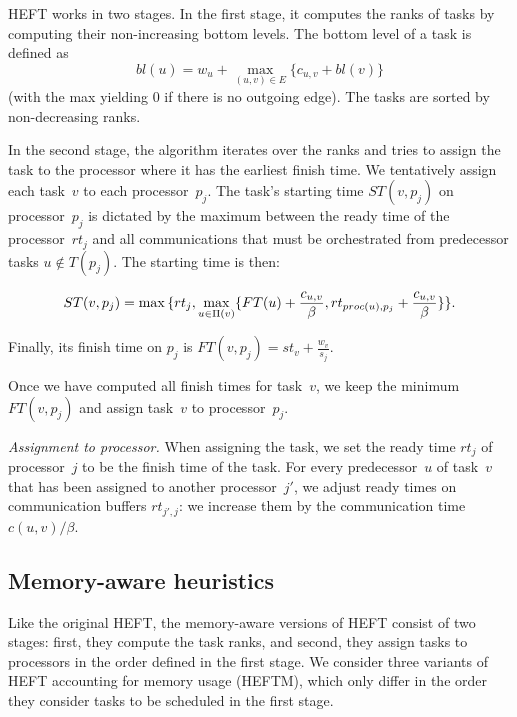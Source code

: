\documentclass[conference]{IEEEtran}
\begin{document}
HEFT works in two stages.
In the first stage, it computes the ranks of tasks by computing their non-increasing bottom levels.
The bottom level of a task is defined as
\[
bl(u) = w_u + \max_{(u,v)\in E} \{c_{u,v} + bl(v)\}
\]
(with the max yielding $0$ if there is no outgoing edge).
The tasks are sorted by non-decreasing ranks.

In the second stage, the algorithm iterates over the ranks and tries to assign the task to the processor where it
has the earliest finish time.
We tentatively assign each task~$v$ to each processor~$p_j$.
The task's starting time $ST(v,p_j)$ on processor~$p_j$ is dictated by the maximum between the ready time of the processor~$rt_j$
and all communications that
must be orchestrated from predecessor tasks $u\notin T(p_j)$.
The starting time is then:

{\footnotesize{   \[ST(v, p_j) = \max{ \Large\{rt_j, \max_{ u \in \Pi(v)}\{ FT(u)+ \frac{c_{u,v}}{\beta} , 
rt_{proc(u), p_j} + \frac{c_{u,v}}{\beta}  \} \Large\} } . \]}}

Finally, its finish time on $p_j$ is
$FT(v,p_j) = st_v + \frac{w_v}{s_j}$.

Once we have computed all finish times for task~$v$,
we keep the minimum $FT(v,p_j)$ and assign task~$v$
to processor~$p_j$.

\textit{Assignment to processor. }
When assigning the task, we set the ready time $rt_j$ of  processor~$j$ to be the finish time of the task.
For every predecessor~$u$ of task~$v$ that has been assigned to another processor~$j'$, we adjust ready times on
communication buffers $rt_{j', j}$: %
we increase them by the
communication time $c( u,v) / \beta$.


\subsection{Memory-aware heuristics}
\label{sec.heftm}
%
Like the original HEFT, the memory-aware versions of HEFT consist of two stages:
first, they compute the task ranks,
and second, they assign tasks to processors in the order defined in the first stage.
We consider three variants of HEFT accounting for memory usage (HEFTM), which only
differ in the order they consider tasks to be scheduled in the first stage.

\medskip
{}
\end{document}
